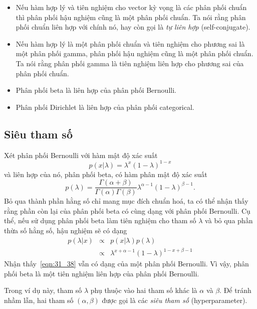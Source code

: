 \begin{itemize}
\item Nếu hàm hợp lý và tiên nghiệm cho vector kỳ vọng là các phân phối
chuẩn thì phân phối hậu nghiệm cũng là một phân phối chuẩn. Ta nói rằng phân
phối chuẩn liên hợp với chính nó, hay còn gọi là \textit{tự liên hợp} (self-conjugate).

\item Nếu hàm hợp lý là một phân phối chuẩn và tiên nghiệm
cho phương sai là một {phân phối gamma}, phân phối hậu nghiệm cũng là một phân phối chuẩn. Ta nói rằng phân phối gamma là tiên nghiệm liên hợp cho phương sai của phân phối chuẩn.

\item Phân phối beta là liên hợp của phân phối Bernoulli.

\item Phân phối Dirichlet là liên hợp của phân phối categorical.

\end{itemize}

\subsection{Siêu tham số}
Xét phân phối Bernoulli với hàm mật độ xác suất
\begin{equation}
p(x | \lambda) = \lambda^x ( 1 - \lambda)^{1 - x}
\end{equation}
và liên hợp của nó, phân phối beta, có hàm phân mật độ xác suất
\begin{equation}
p(\lambda) = \frac{\Gamma(\alpha + \beta)}{\Gamma(\alpha) \Gamma(\beta)} \lambda^{\alpha - 1} ( 1 - \lambda) ^{\beta - 1}.
\end{equation}
Bỏ qua thành phần hằng số chỉ mang mục đích chuẩn hoá, ta có thể nhận thấy rằng
phần còn lại của phân phối beta có cùng dạng với phân phối Bernoulli. Cụ thể,
nếu sử dụng phân phối beta làm tiên nghiệm cho tham số $\lambda$ và bỏ qua
phần thừa số hằng số, hậu nghiệm sẽ có dạng
\begin{eqnarray}
\nonumber
p(\lambda | x) & \propto & p(x | \lambda) p(\lambda) \\\
\label{eqn:31_38}
& \propto & \lambda^{x + \alpha - 1}(1 - \lambda)^{1 - x + \beta - 1}
\end{eqnarray}
Nhận thấy~\eqref{eqn:31_38} {vẫn có dạng của một phân phối
Bernoulli.} Vì vậy, phân phối beta là một tiên nghiệm liên hợp của phân phối Bernoulli.

Trong ví dụ này, tham số $\lambda$ phụ thuộc vào hai tham số khác là $\alpha$ và
$\beta$. Để tránh nhầm lẫn, hai tham số $(\alpha, \beta)$ được gọi là các
\textit{siêu tham số} (hyperparameter).

